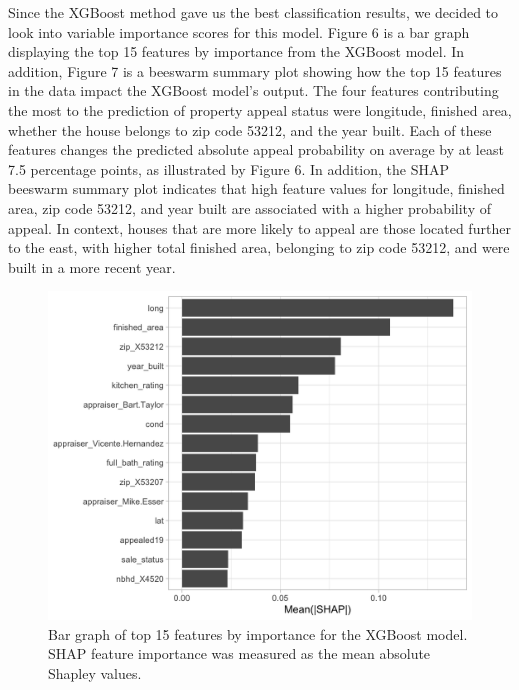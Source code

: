 \documentclass[
  12pt,
]{article}
\begin{document}
Since the XGBoost method gave us the best classification results, we
decided to look into variable importance scores for this model. Figure 6
is a bar graph displaying the top 15 features by importance from the
XGBoost model. In addition, Figure 7 is a beeswarm summary plot showing
how the top 15 features in the data impact the XGBoost model's output.
The four features contributing the most to the prediction of property appeal
status were longitude, finished area, whether the house belongs to zip
code 53212, and the year built. Each of these features changes the
predicted absolute appeal probability on average by at least 7.5
percentage points, as illustrated by Figure 6. In addition, the SHAP
beeswarm summary plot indicates that high feature values for longitude,
finished area, zip code 53212, and year built are associated with a
higher probability of appeal. In context, houses that are more likely to
appeal are those located further to the east, with higher total finished
area, belonging to zip code 53212, and were built in a more recent year.

\begin{figure}[H]

{\centering \includegraphics[width=0.7\linewidth]{shapbar} 

}

\caption{Bar graph of top 15 features by importance for the XGBoost model. SHAP feature importance was measured as the mean absolute Shapley values.}\label{fig:unnamed-chunk-8}
\end{figure}
\end{document}

